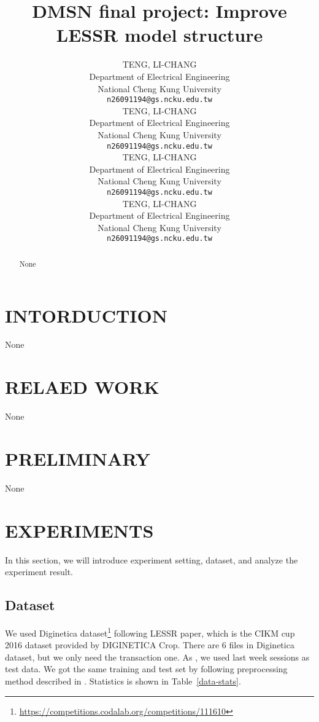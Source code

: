 \documentclass{article}
\title{DMSN final project: Improve LESSR model structure}
\author{%
  TENG, LI-CHANG\\
  Department of Electrical Engineering\\
  National Cheng Kung University\\
  \texttt{n26091194@gs.ncku.edu.tw} \\
  \And
  TENG, LI-CHANG\\
  Department of Electrical Engineering\\
  National Cheng Kung University\\
  \texttt{n26091194@gs.ncku.edu.tw} \\
  \AND
  TENG, LI-CHANG\\
  Department of Electrical Engineering\\
  National Cheng Kung University\\
  \texttt{n26091194@gs.ncku.edu.tw} \\
  \And
  TENG, LI-CHANG\\
  Department of Electrical Engineering\\
  National Cheng Kung University\\
  \texttt{n26091194@gs.ncku.edu.tw} \\
}
\begin{document}
\maketitle

\begin{abstract}
    None
    \vspace{2cm}
\end{abstract}


\section{INTORDUCTION}
None
\vspace{2cm}


\section{RELAED WORK}
None
\vspace{2cm}


\section{PRELIMINARY}
None
\vspace{2cm}



\section{EXPERIMENTS}

In this section, we will introduce experiment setting,
dataset, and analyze the experiment result.

\subsection{Dataset}

We used Diginetica dataset\footnote{\url{https://competitions.codalab.org/competitions/111610}} following LESSR \cite{chen2020lessr} paper, which is the CIKM cup 2016 dataset provided by DIGINETICA Crop. There are 6 files in Diginetica dataset, but we only need the transaction one. As \cite{chen2020lessr}, we used last week sessions as test data. We got the same training and test set by following preprocessing method described in \cite{chen2020lessr}. Statistics is shown in Table~\ref{data-stats}.
\end{document}
